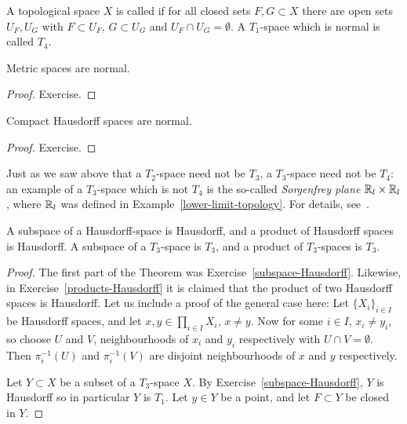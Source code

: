 \begin{defn}
  A topological space $X$ is called  if for all closed sets $F,G \subset X$ there are open sets $U_F, U_G$ with $F \subset U_F$, $G \subset U_G$ and $U_F \cap U_G = \emptyset$. A $T_1$-space which is normal is called $T_4$.
\end{defn}
\begin{prop}
  Metric spaces are normal.
\end{prop}
\begin{proof}
  Exercise.
\end{proof}
\begin{prop}
  Compact Hausdorff spaces are normal.
\end{prop}
\begin{proof}
  Exercise.
\end{proof}
\begin{example}
  Just as we saw above that a $T_2$-space need not be $T_3$, a $T_3$-space need not be $T_4$: an example of a $T_3$-space which is not $T_4$ is the so-called \emph{Sorgenfrey plane} $\mathbb{R}_l \times \mathbb{R}_l$, where $\mathbb{R}_l$ was defined in Example~\ref{lower-limit-topology}. For details, see~\cite[\S 31, Example 3]{Mun}.
\end{example}

\begin{thm}
  A subspace of a Hausdorff-space is Hausdorff, and a product of Hausdorff spaces is Hausdorff. A subspace of a $T_3$-space is $T_3$, and a product of $T_3$-spaces is $T_3$.
\end{thm}
\begin{proof}
  The first part of the Theorem was Exercise~\ref{subspace-Hausdorff}. Likewise, in Exercise~\ref{products-Hausdorff} it is claimed that the product of two Hausdorff spaces is Hausdorff. Let us include a proof of the general case here: Let $\{X_i\}_{i \in I}$ be Hausdorff spaces, and let $x, y \in \prod_{i \in I} X_i$, $x \not= y$. Now for some $i \in I$, $x_i \not= y_i$, so choose $U$ and $V$, neighbourhoods of $x_i$ and $y_i$ respectively with $U \cap V = \emptyset$. Then $\pi_i^{-1}(U)$ and $\pi_i^{-1}(V)$ are disjoint neighbourhoods of $x$ and $y$ respectively.

  Let $Y \subset X$ be a subset of a $T_3$-space $X$. By Exercise~\ref{subspace-Hausdorff}, $Y$ is Hausdorff so in particular $Y$ is $T_1$. Let $y \in Y$ be a point, and let $F \subset Y$ be closed in $Y$.
\end{proof}

